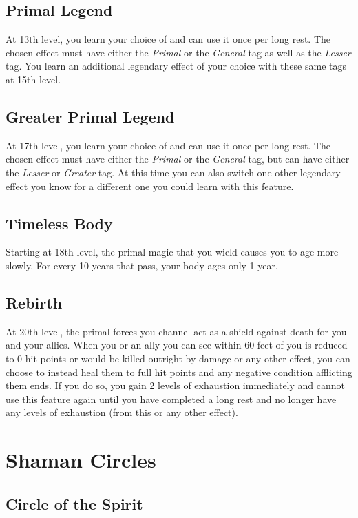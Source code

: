 \subsection{Primal Legend}
At 13th level, you learn your choice of  and can use it once per long rest. The chosen effect must have either the \textit{Primal} or the \textit{General} tag as well as the \textit{Lesser} tag. You learn an additional legendary effect of your choice with these same tags at 15th level.

\subsection{Greater Primal Legend}
At 17th level, you learn your choice of  and can use it once per long rest. The chosen effect must have either the \textit{Primal} or the \textit{General} tag, but can have either the \textit{Lesser} or \textit{Greater} tag. At this time you can also switch one other legendary effect you know for a different one you could learn with this feature.

\subsection{Timeless Body}

Starting at 18th level, the primal magic that you wield causes you to age more slowly. For every 10 years that pass, your body ages only 1 year.

\subsection{Rebirth}
At 20th level, the primal forces you channel act as a shield against death for you and your allies. When you or an ally you can see within 60 feet of you is reduced to 0 hit points or would be killed outright by damage or any other effect, you can choose to instead heal them to full hit points and any negative condition afflicting them ends. If you do so, you gain 2 levels of exhaustion immediately and cannot use this feature again until you have completed a long rest and no longer have any levels of exhaustion (from this or any other effect).

\section{Shaman Circles}

\subsection{Circle of the Spirit}

